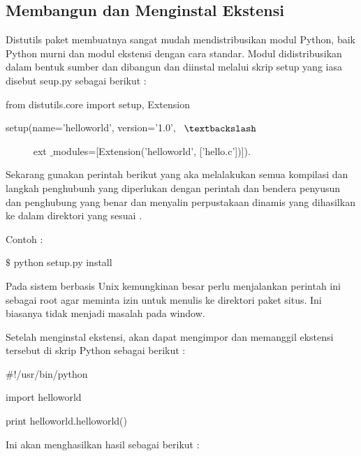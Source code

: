 \documentclass{wileySix}
\begin{document}
\begin{myEnumerate}
\begin{myEnumerate}
{\begin{myEnumerate}
\section{Membangun dan Menginstal Ekstensi}
\par
\vspace{12pt}
\vspace{12pt}
\noindent 
\hspace*{0.5in} Distutils paket membuatnya sangat mudah mendistribusikan modul Python, baik Python murni dan modul ekstensi dengan cara standar. Modul didistribusikan dalam bentuk sumber dan dibangun dan diinstal melalui skrip setup yang iasa disebut seup.py sebagai berikut : \par
\noindent 
from distutils.core import setup, Extension \par
\noindent 
setup(name='helloworld', version='1.0',~  $  \textbackslash  $ \par
\noindent 
~~~~~ ext $  \_  $modules=[Extension('helloworld', ['hello.c'])]). \par
\vspace{12pt}
\noindent 
\hspace*{0.5in} Sekarang gunakan perintah berikut yang aka melalakukan semua kompilasi dan langkah penghubunh yang diperlukan dengan perintah dan bendera penyusun dan penghubung yang benar dan menyalin perpustakaan dinamis yang dihasilkan ke dalam direktori yang sesuai . \par
\vspace{12pt}
\noindent 
Contoh : \par
\noindent 
$  \$  $ python setup.py install \par
\vspace{12pt}
\noindent 
\hspace*{0.5in} Pada sistem berbasis Unix kemungkinan besar perlu menjalankan perintah ini sebagai root agar meminta izin untuk menulis ke direktori paket situs. Ini biasanya tidak menjadi masalah pada window. \par
Setelah menginstal ekstensi, akan dapat mengimpor dan memanggil ekstensi tersebut di skrip Python  sebagai berikut : \par
\noindent 
$  \#  $!/usr/bin/python \par
\noindent 
import helloworld \par
\vspace{12pt}
\noindent 
print helloworld.helloworld() \par
\vspace{14pt}
\noindent 
Ini akan menghasilkan hasil sebagai berikut  : \par

\end{myEnumerate}}
\end{myEnumerate}
\end{myEnumerate}
\end{document}
